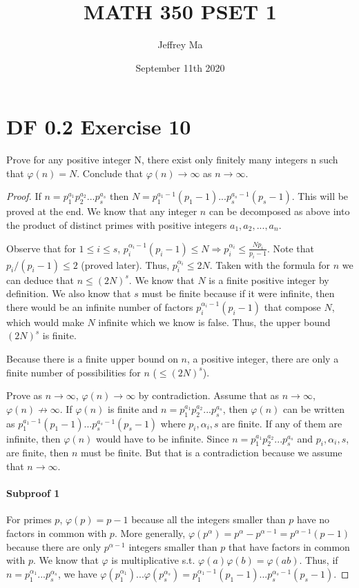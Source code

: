 \documentclass{article}
\title{MATH 350 PSET 1}
\author{Jeffrey Ma}
\date{September 11th 2020}
\begin{document}
\maketitle

\section{DF 0.2 Exercise 10}

Prove for any positive integer N, there exist only finitely many integers n such that $\varphi(n)=N$. Conclude that ${\varphi(n)\to\infty}$ as ${n\to\infty}$.

\begin{proof}

If $n = p_1^{a_1}p_2^{a_2}...p_s^{a_s}$ then $N = p_1^{a_1-1}(p_1-1)
...p_s^{a_s-1}(p_s-1)$. This will be proved at the end. We know that any integer $n$ can be decomposed as above into the product of distinct primes with positive integers $a_1, a_2,...,a_n$. 

Observe that for $1 \leq i \leq s$, $p_i^{\alpha_i-1}(p_i - 1) \leq N \Rightarrow p_i^{\alpha_i} \leq \frac{Np_i}{p_i - 1}$. Note that $p_i/(p_i - 1) \leq 2$ (proved later). Thus, $p_i^{\alpha_i} \leq 2N$. Taken with the formula for $
n$ we can deduce that $n \leq (2N)^s$. We know that $N$ is a finite positive integer by definition. We also know that $s$ must be finite because if it were infinite, then there would be an infinite number of factors $p_i^{\alpha_i-1}(p_i - 1)$ that compose $N$, which would make $N$ infinite which we know is false. Thus, the upper bound $(2N)^s$ is finite.

Because there is a finite upper bound on $n$, a positive integer, there are only a finite number of possibilities for $n$ ($\leq (2N)^s$).

Prove as ${n\to\infty}$, ${\varphi(n)\to\infty}$ by contradiction. Assume that as ${n\to\infty}$, ${\varphi(n)\not\to\infty}$. If $\varphi(n)$ is finite and $n = p_1^{a_1}p_2^{a_2}...p_s^{a_s}$, then $\varphi(n)$ can be written as $p_1^{a_1-1}(p_1-1)...p_s^{a_s-1}(p_s-1)$ where $p_i, \alpha_i, s$ are finite. If any of them are infinite, then $\varphi(n)$ would have to be infinite. Since $n = p_1^{a_1}p_2^{a_2}...p_s^{a_s}$ and $p_i, \alpha_i, s$, are finite, then $n$ must be finite. But that is a contradiction because we assume that ${n\to\infty}$.

\paragraph{Subproof 1}
For primes $p$, $\varphi(p) = p - 1$ because all the integers smaller than $p$ have no factors in common with $p$. More generally, $\varphi(p^\alpha) = p^\alpha - p^{\alpha - 1} = p^{\alpha - 1}(p - 1)$ because there are only $p^{\alpha - 1}$ integers smaller than $p$ that have factors in common with $p$. We know that $\varphi$ is multiplicative s.t. $\varphi(a)\varphi(b)=\varphi(ab)$. Thus, if $n = p_1^{\alpha_1}...p_s^{\alpha_s}$, we have $\varphi(p_1^{\alpha_1})...\varphi(p_s^{\alpha_s}) = p_1^{\alpha_1 - 1}(p_1 - 1)...p_s^{\alpha_s - 1}(p_s - 1)$.


\end{proof}
\end{document}
